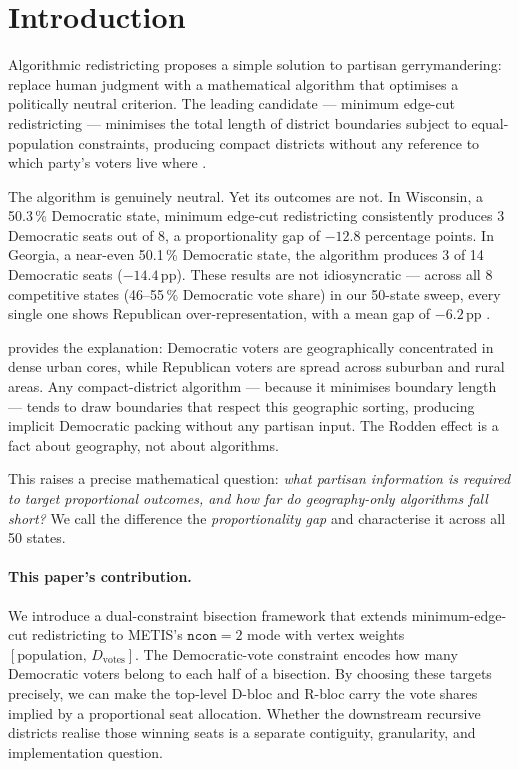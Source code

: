 \section{Introduction}
\label{sec:intro}

Algorithmic redistricting proposes a simple solution to partisan gerrymandering:
replace human judgment with a mathematical algorithm that optimises a
politically neutral criterion.
The leading candidate --- minimum edge-cut redistricting --- minimises the
total length of district boundaries subject to equal-population constraints,
producing compact districts without any reference to which party's voters
live where \citep{karypis1998,b8paper,b9paper}.

The algorithm is genuinely neutral.
Yet its outcomes are not.
In Wisconsin, a 50.3\,\% Democratic state, minimum edge-cut redistricting
consistently produces 3 Democratic seats out of 8, a proportionality gap of
$-12.8$ percentage points.
In Georgia, a near-even 50.1\,\% Democratic state, the algorithm produces
3 of 14 Democratic seats ($-14.4$\,pp).
These results are not idiosyncratic --- across all 8 competitive states
(46--55\,\% Democratic vote share) in our 50-state sweep, every single one
shows Republican over-representation, with a mean gap of $-6.2$\,pp
\citep{b9paper}.

\citet{rodden2019} provides the explanation: Democratic voters are geographically
concentrated in dense urban cores, while Republican voters are spread across
suburban and rural areas.
Any compact-district algorithm --- because it minimises boundary length ---
tends to draw boundaries that respect this geographic sorting, producing
implicit Democratic packing without any partisan input.
The Rodden effect is a fact about geography, not about algorithms.

This raises a precise mathematical question: \emph{what partisan information
is required to target proportional outcomes, and how far do geography-only
algorithms fall short?}
We call the difference the \emph{proportionality gap} and characterise it
across all 50 states.

\paragraph{This paper's contribution.}
We introduce a dual-constraint bisection framework that extends minimum-edge-cut
redistricting to METIS's $\mathtt{ncon}=2$ mode with vertex weights
$[\text{population},\, D_{\text{votes}}]$.
The Democratic-vote constraint encodes how many Democratic voters belong to
each half of a bisection.
By choosing these targets precisely, we can make the top-level D-bloc and
R-bloc carry the vote shares implied by a proportional seat allocation.
Whether the downstream recursive districts realise those winning seats is a
separate contiguity, granularity, and implementation question.

